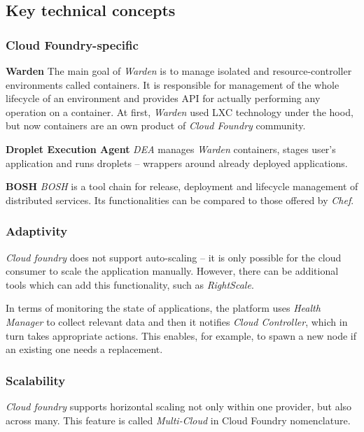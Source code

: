 \subsection{Key technical concepts}

\subsubsection{Cloud Foundry-specific}
\begin{asparaenum}
\item[\textbf{Warden}] The main goal of \emph{Warden} is to manage isolated and resource-controller environments called containers. It is responsible for management of the whole lifecycle of an environment and provides API for actually performing any operation on a container. At first, \emph{Warden} used LXC technology under the hood, but now containers are an own product of \emph{Cloud Foundry} community.
\item[\textbf{Droplet Execution Agent}] \emph{DEA} manages \emph{Warden} containers, stages user's application and runs droplets -- wrappers around already deployed applications.
\item[\textbf{BOSH}] \emph{BOSH} is a tool chain for release, deployment and lifecycle management of distributed services. Its functionalities can be compared to those offered by \emph{Chef}.
\end{asparaenum}

\subsubsection{Adaptivity}
\emph{Cloud foundry} does not support auto-scaling -- it is only possible for the cloud consumer to scale the application manually. However, there can be additional tools which can add this functionality, such as \emph{RightScale}.

In terms of monitoring the state of applications, the platform uses \emph{Health Manager} to collect relevant data and then it notifies \emph{Cloud Controller}, which in turn takes appropriate actions. This enables, for example, to spawn a new node if an existing one needs a replacement.

\subsubsection{Scalability}
\emph{Cloud foundry} supports horizontal scaling not only within one provider, but also across many. This feature is called \emph{Multi-Cloud} in Cloud Foundry nomenclature.

